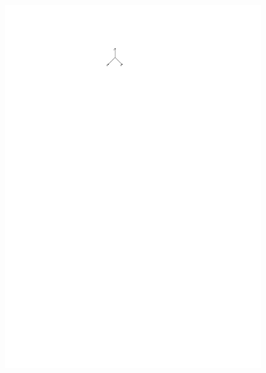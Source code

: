 \documentclass[a4paper]{article}
\theoremstyle{definition}
\begin{document}
\begin{figure}[htbp]
\begin{center}
\includegraphics[scale=1.5]{fig/he1}
\hspace{2cm}

\end{center}
\end{figure}
\end{document}

